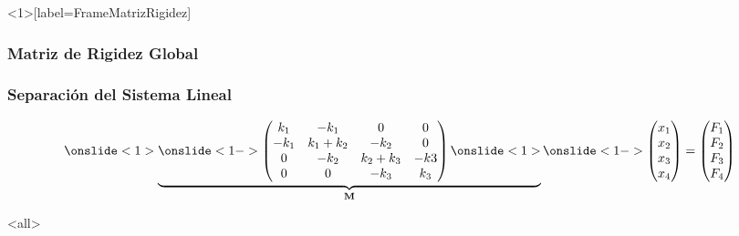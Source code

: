 \mode*

\begin{frame}<1>[label=FrameMatrizRigidez]
  \frametitle<presentation>{Matriz de Rigidez Global}
  \frametitle<2->{Separación del Sistema Lineal}

  \begin{equation} \label{eqSistemaLineal}
    \onslide<1> \underbrace{
      \onslide<1->
      \begin{pmatrix}
	k_1  & -k_1     & 0    & 0 \\
	-k_1 & k_1 +k_2 & -k_2 & 0 \\
	0    & -k_2     & k_2 + k_3 & -k3\\
	0    &  0       & -k_3      & k_3
      \end{pmatrix}
    \onslide<1> }_{\mathbf{M}}
  \onslide<1->
    \begin{pmatrix}
      x_1\\
      x_2\\
      x_3\\
      x_4
    \end{pmatrix}
    =
    \begin{pmatrix}
      F_1\\
      F_2\\
      F_3\\
      F_4
    \end{pmatrix}
  \end{equation}

\end{frame}

\mode<all>
